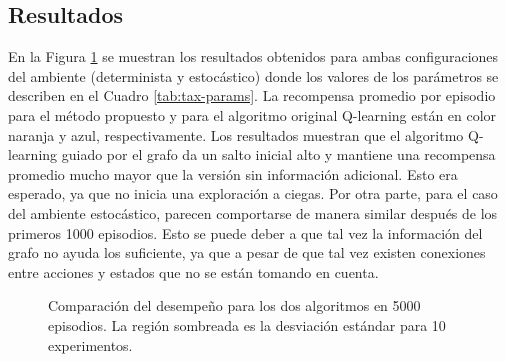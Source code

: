 \subsection{Resultados}

En la Figura \ref{fig:results-taxi} se muestran los resultados obtenidos
para ambas configuraciones del ambiente (determinista y estocástico) donde
los valores de los parámetros se describen en el Cuadro \ref{tab:tax-params}.
La recompensa promedio por episodio para el método propuesto y para el algoritmo
original Q-learning están en color naranja y azul, respectivamente. 
Los resultados muestran que el algoritmo Q-learning guiado por el grafo da un salto inicial alto y mantiene una recompensa promedio mucho mayor que la versión sin información adicional. Esto era esperado, ya que 
no inicia una exploración a ciegas. Por otra parte, para el caso 
del ambiente estocástico, parecen comportarse de manera similar después de los
primeros 1000 episodios. Esto se puede deber a que tal vez la información del 
grafo no ayuda los suficiente, ya que a pesar de que tal vez existen
conexiones entre acciones y estados que no se están tomando en cuenta.


\begin{figure}[H]
  \centering
  \hfill
  \caption{Comparación del desempeño para los dos algoritmos en 5000 episodios. La región sombreada es la desviación estándar para 10 experimentos.}
  \label{fig:results-taxi}
\end{figure}
